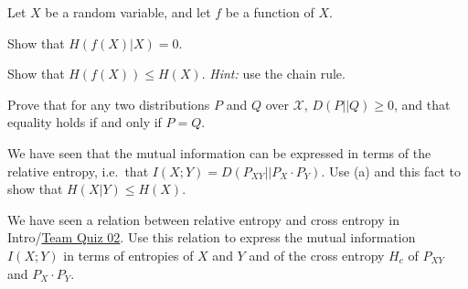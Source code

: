 \documentclass[a4paper,10pt,landscape,twocolumn]{scrartcl}
\begin{document}
\begin{exercise}
Let $X$ be a random variable, and let $f$ be a function of $X$.
	\begin{subex}[(1pt)]
	Show that $H(f(X) | X) = 0$.
	\end{subex}
	\begin{subex}[(2pt)]
	Show that $H(f(X)) \leq H(X)$. \emph{Hint:} use the chain rule.
	\end{subex}
\end{exercise}


\begin{exercise}
	\begin{subex}[(5pt)]
	Prove that for any two distributions $P$ and $Q$ over $\mathcal{X}$, $D(P||Q) \geq 0$, and that equality holds if and only if $P = Q$.
	\end{subex}
	\begin{subex}[(1pt)]
	We have seen that the mutual information can be expressed in
        terms of the relative entropy, i.e.\ that $I(X;Y) =
        D(P_{XY}||P_X \cdot P_Y)$. Use (a) and this fact to show that $H(X|Y) \leq H(X)$.
	\end{subex}
	\begin{subex}[(2pt)]
	We have seen a relation between relative entropy and cross
        entropy in Intro/\href{https://canvas.uva.nl/courses/2205/assignments/27821}{Team Quiz 02}. Use this relation to express
        the mutual information $I(X;Y)$ in terms of entropies of $X$
        and $Y$ and of the cross entropy $H_c$ of $P_{XY}$ and $P_X
        \cdot P_Y$.
	\end{subex}
\end{exercise}
\end{document}
